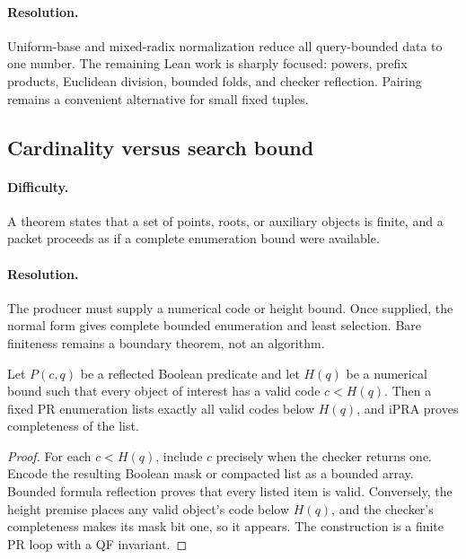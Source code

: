\paragraph{Resolution.}
Uniform-base and mixed-radix normalization reduce all query-bounded data to one
number.  The remaining Lean work is sharply focused: powers, prefix products,
Euclidean division, bounded folds, and checker reflection.  Pairing remains a
convenient alternative for small fixed tuples.

\subsection{Cardinality versus search bound}

\paragraph{Difficulty.}
A theorem states that a set of points, roots, or auxiliary objects is finite,
and a packet proceeds as if a complete enumeration bound were available.

\paragraph{Resolution.}
The producer must supply a numerical code or height bound.  Once supplied, the
normal form gives complete bounded enumeration and least selection.  Bare
finiteness remains a boundary theorem, not an algorithm.

\begin{theorem}\label{thm:height-list}
Let \(P(c,q)\) be a reflected Boolean predicate and let \(H(q)\) be a numerical
bound such that every object of interest has a valid code \(c<H(q)\).  Then a
fixed PR enumeration lists exactly all valid codes below \(H(q)\), and iPRA
proves completeness of the list.
\end{theorem}

\begin{proof}
For each \(c<H(q)\), include \(c\) precisely when the checker returns one.
Encode the resulting Boolean mask or compacted list as a bounded array.  Bounded
formula reflection proves that every listed item is valid.  Conversely, the
height premise places any valid object's code below \(H(q)\), and the checker's
completeness makes its mask bit one, so it appears.  The construction is a
finite PR loop with a QF invariant.
\end{proof}

